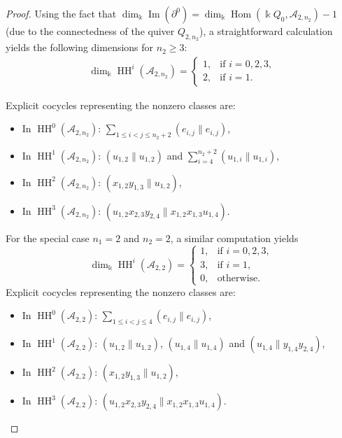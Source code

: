 \documentclass[a4paper, reqno, 11pt]{amsart}
\theoremstyle{definition}
\begin{document}
\begin{proof}
	Using the fact that $\dim_\Bbbk \operatorname{Im}(\partial^0) = \dim_\Bbbk \operatorname{Hom}(\Bbbk Q_0, \mathcal{A}_{2, n_2}) - 1$ (due to the connectedness of the quiver $Q_{2,n_2}$), a straightforward calculation yields the following dimensions for $n_2 \ge 3$:
	\begin{align*}
		\dim_\Bbbk \operatorname{HH}^i(\mathcal{A}_{2, n_2}) = \begin{cases}
			1, & \text{if $i=0, 2, 3$,}\\
			2, & \text{if $i=1$.}
		\end{cases}
	\end{align*}
	
	Explicit cocycles representing the nonzero classes are:
	\begin{itemize}[leftmargin=*, label=--]
		\item In $\operatorname{HH}^0(\mathcal{A}_{2, n_2})$: $\sum\limits_{1\le i<j\le n_2+2} (e_{i,j} \parallel e_{i,j})$,
		\item In $\operatorname{HH}^1(\mathcal{A}_{2, n_2})$: $(u_{1,2} \parallel u_{1,2})$ and $\sum\limits_{i=4}^{n_2+2}(u_{1,i} \parallel u_{1,i})$,
		\item In $\operatorname{HH}^2(\mathcal{A}_{2, n_2})$: $(x_{1,2}y_{1,3} \parallel u_{1,2})$,
		\item In $\operatorname{HH}^3(\mathcal{A}_{2, n_2})$: $(u_{1,2}x_{2,3}y_{2,4} \parallel x_{1,2}x_{1,3}u_{1,4})$.
	\end{itemize}
	
	For the special case $n_1 = 2$ and $n_2 = 2$, a similar computation yields
	\[
	\dim_{\Bbbk} \operatorname{HH}^i(\mathcal{A}_{2,2}) =
	\begin{cases}
		1,& \text{if } i = 0,2,3,\\
		3,& \text{if } i = 1,\\
		0,& \text{otherwise}.
	\end{cases}
	\]
	Explicit cocycles representing the nonzero classes are:
	\begin{itemize}[leftmargin=*, label=--]
		\item In $\operatorname{HH}^0(\mathcal{A}_{2, 2})$: $\sum\limits_{1\le i<j\le 4} (e_{i,j} \parallel e_{i,j})$,
		\item In $\operatorname{HH}^1(\mathcal{A}_{2, 2})$: $(u_{1,2} \parallel u_{1,2})$, $(u_{1,4} \parallel u_{1,4})$ and $(u_{1,4} \parallel y_{1,4}y_{2,4})$,
		\item In $\operatorname{HH}^2(\mathcal{A}_{2, 2})$: $(x_{1,2}y_{1,3} \parallel u_{1,2})$,
		\item In $\operatorname{HH}^3(\mathcal{A}_{2, 2})$: $(u_{1,2}x_{2,3}y_{2,4} \parallel x_{1,2}x_{1,3}u_{1,4})$.
	\end{itemize}
\end{proof}
\end{document}
